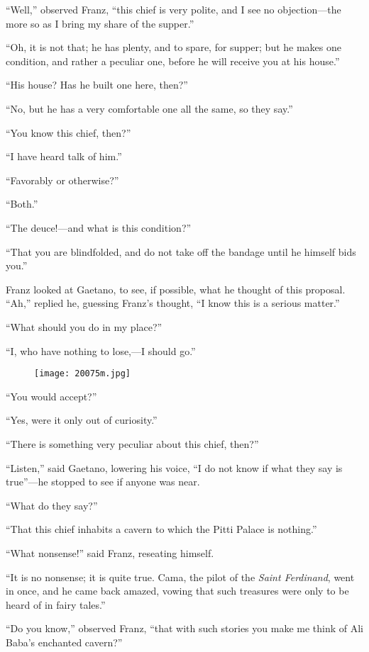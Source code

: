 “Well,” observed Franz, “this chief is very polite, and I see no
objection—the more so as I bring my share of the supper.”

“Oh, it is not that; he has plenty, and to spare, for supper; but he
makes one condition, and rather a peculiar one, before he will receive
you at his house.”

“His house? Has he built one here, then?”

“No, but he has a very comfortable one all the same, so they say.”

“You know this chief, then?”

“I have heard talk of him.”

“Favorably or otherwise?”

“Both.”

“The deuce!—and what is this condition?”

“That you are blindfolded, and do not take off the bandage until he
himself bids you.”

Franz looked at Gaetano, to see, if possible, what he thought of this
proposal. “Ah,” replied he, guessing Franz’s thought, “I know this is a
serious matter.”

“What should you do in my place?”

“I, who have nothing to lose,—I should go.”

\begin{figure}[ht]
\texttt{[image: 20075m.jpg]}
\end{figure}

“You would accept?”

“Yes, were it only out of curiosity.”

“There is something very peculiar about this chief, then?”

“Listen,” said Gaetano, lowering his voice, “I do not know if what they
say is true”—he stopped to see if anyone was near.

“What do they say?”

“That this chief inhabits a cavern to which the Pitti Palace is
nothing.”

“What nonsense!” said Franz, reseating himself.

“It is no nonsense; it is quite true. Cama, the pilot of the \textit{Saint
Ferdinand}, went in once, and he came back amazed, vowing that such
treasures were only to be heard of in fairy tales.”

“Do you know,” observed Franz, “that with such stories you make me
think of Ali Baba’s enchanted cavern?”

